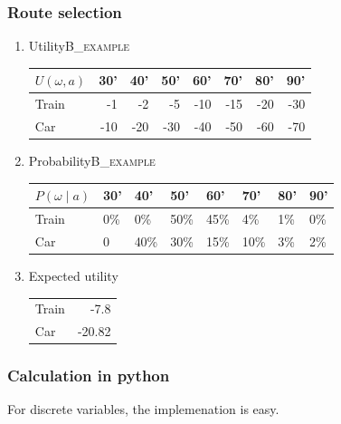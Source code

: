 \documentclass[smaller]{article}
\begin{document}
\subsubsection{Route selection}
\label{sec:org6a1dfc5}
\begin{enumerate}
\item Utility\hfill{}\textsc{B\_example}
\label{sec:org500bcdd}
\begin{center}
\begin{tabular}{l|rrrrrrr}
\hline
\(U(\omega, a)\) & 30' & 40' & 50' & 60' & 70' & 80' & 90'\\
\hline
Train & -1 & -2 & -5 & -10 & -15 & -20 & -30\\
Car & -10 & -20 & -30 & -40 & -50 & -60 & -70\\
\hline
\end{tabular}
\end{center}

\item Probability\hfill{}\textsc{B\_example}
\label{sec:orgc64f54f}
\begin{center}
\begin{tabular}{l|lllllll}
\hline
\(P(\omega \mid a)\) & 30' & 40' & 50' & 60' & 70' & 80' & 90'\\
\hline
Train & 0\% & 0\% & 50\% & 45\% & 4\% & 1\% & 0\%\\
Car & 0 & 40\% & 30\% & 15\% & 10\% & 3\% & 2\%\\
\hline
\end{tabular}
\end{center}

\item Expected utility
\label{sec:org748895c}

\begin{center}
\begin{tabular}{l|r}
Train & -7.8\\
Car & -20.82\\
\end{tabular}
\end{center}
\end{enumerate}

\subsubsection{Calculation in python}
\label{sec:orgcf4f602}
For discrete variables, the implemenation is easy.
\end{document}
